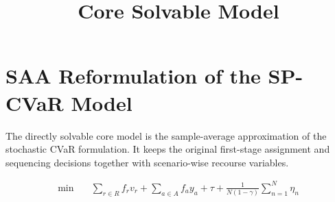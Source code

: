 \documentclass[11pt,a4paper]{article}
\title{Core Solvable Model}
\author{}
\date{}
\begin{document}
\maketitle

\section*{SAA Reformulation of the SP-CVaR Model}
The directly solvable core model is the sample-average approximation of the stochastic CVaR
formulation. It keeps the original first-stage assignment and sequencing decisions together with
scenario-wise recourse variables.

\begin{equation}
\begin{aligned}
\min \quad
& \sum_{r \in R} f_r v_r
+ \sum_{a \in A} f_a y_a
+ \tau
+ \frac{1}{N(1-\gamma)} \sum_{n=1}^N \eta_n
\end{aligned}
\tag{M1}
\end{equation}
\end{document}
